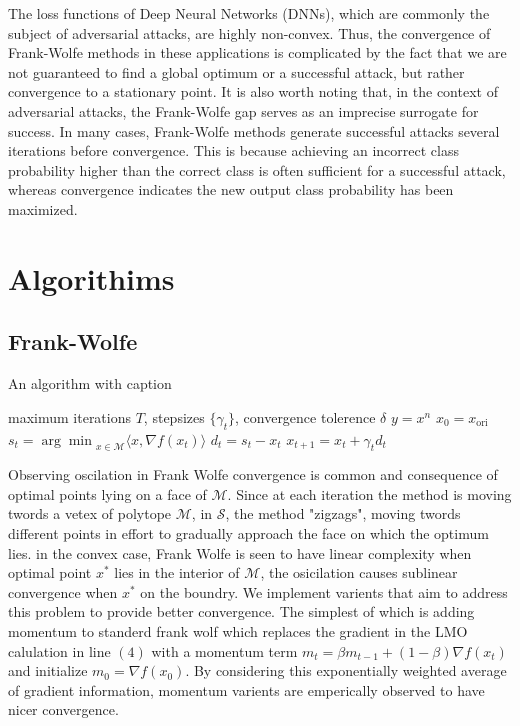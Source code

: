 \documentclass{article}
\begin{document}
The loss functions of Deep Neural Networks (DNNs), which are commonly the subject of adversarial attacks, are highly non-convex. Thus, the convergence of Frank-Wolfe methods in these applications is complicated by the fact that we are not guaranteed to find a global optimum or a successful attack, but rather convergence to a stationary point. 
It is also worth noting that, in the context of adversarial attacks, the Frank-Wolfe gap serves as an imprecise surrogate for success. In many cases, Frank-Wolfe methods generate successful attacks several iterations before convergence. This is because achieving an incorrect class probability higher than the correct class is often sufficient for a successful attack, whereas convergence indicates the new output class probability has been maximized.

\section{Algorithims}
\subsection{Frank-Wolfe}
\begin{algorithm}
\caption{An algorithm with caption}\label{alg:cap}
\begin{algorithmic}[1]
\Require maximum iterations $T$, stepsizes $\{\gamma_t\}$, convergence tolerence $\delta$
\Ensure $y = x^n$
\State $x_0 = x_{\text{ori}}$
	\State $s_t = {\arg \min}_{x\in\mathcal{M}} \langle x, \nabla f(x_t)\rangle$ 
	\State $d_t = s_t - x_t$
	\State $x_{t+1} = x_t + \gamma_t d_t$
	  \hfill {}
	\EndIf
\EndFor
\end{algorithmic}
\end{algorithm}

Observing oscilation in Frank Wolfe convergence is common and consequence of optimal points lying on a face of $\mathcal{M}$. Since at each iteration the method is moving twords a vetex of polytope $\mathcal{M}$, in $\mathcal{S}$, the method "zigzags", moving twords different points in effort to gradually approach the face on which the optimum lies. in the convex case, Frank Wolfe is seen to have linear complexity when optimal point $x^*$ lies in the interior of $\mathcal{M}$, the osicilation causes sublinear convergence when $x^*$ on the boundry.
 We implement varients that aim to address this problem to provide better convergence. The simplest of which is adding momentum to standerd frank wolf which replaces the gradient in the LMO calulation in line $(4)$ with a momentum term $m_t  = \beta m_{t-1} + (1-\beta) \nabla f(x_t)$ and initialize $m_0 = \nabla f(x_0)$. By considering this exponentially weighted average of gradient information, momentum varients are emperically observed to have nicer convergence. 
\end{document}

